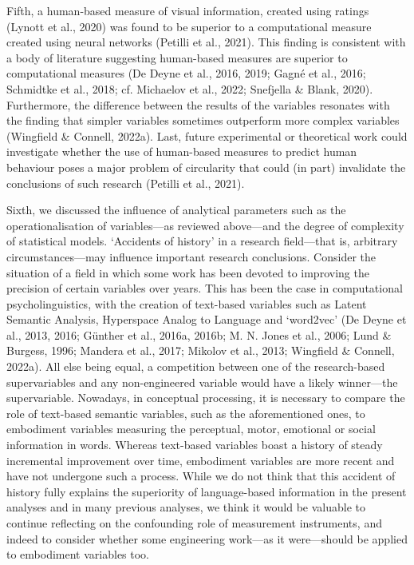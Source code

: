 \documentclass[
  12pt,
  man,floatsintext]{apa7}
\begin{document}
Fifth, a human-based measure of visual information, created using ratings (Lynott et al., 2020) was found to be superior to a computational measure created using neural networks (Petilli et al., 2021). This finding is consistent with a body of literature suggesting human-based measures are superior to computational measures (De Deyne et al., 2016, 2019; Gagné et al., 2016; Schmidtke et al., 2018; cf. Michaelov et al., 2022; Snefjella \& Blank, 2020). Furthermore, the difference between the results of the variables resonates with the finding that simpler variables sometimes outperform more complex variables (Wingfield \& Connell, 2022a). Last, future experimental or theoretical work could investigate whether the use of human-based measures to predict human behaviour poses a major problem of circularity that could (in part) invalidate the conclusions of such research (Petilli et al., 2021).

Sixth, we discussed the influence of analytical parameters such as the operationalisation of variables---as reviewed above---and the degree of complexity of statistical models. `Accidents of history' in a research field---that is, arbitrary circumstances---may influence important research conclusions. Consider the situation of a field in which some work has been devoted to improving the precision of certain variables over years. This has been the case in computational psycholinguistics, with the creation of text-based variables such as Latent Semantic Analysis, Hyperspace Analog to Language and `word2vec' (De Deyne et al., 2013, 2016; Günther et al., 2016a, 2016b; M. N. Jones et al., 2006; Lund \& Burgess, 1996; Mandera et al., 2017; Mikolov et al., 2013; Wingfield \& Connell, 2022a). All else being equal, a competition between one of the research-based supervariables and any non-engineered variable would have a likely winner---the supervariable. Nowadays, in conceptual processing, it is necessary to compare the role of text-based semantic variables, such as the aforementioned ones, to embodiment variables measuring the perceptual, motor, emotional or social information in words. Whereas text-based variables boast a history of steady incremental improvement over time, embodiment variables are more recent and have not undergone such a process. While we do not think that this accident of history fully explains the superiority of language-based information in the present analyses and in many previous analyses, we think it would be valuable to continue reflecting on the confounding role of measurement instruments, and indeed to consider whether some engineering work---as it were---should be applied to embodiment variables too.
\end{document}
